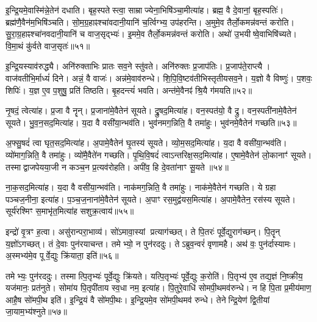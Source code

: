 इ॒न्द्रि॒यमे॒वास्मि॑न्ने॒तेन॑ दधाति।
बृह॒स्पतेस्त्वा॒ साम्राज्येना॒भि\-षि॑ञ्चा॒मीत्या॑ह।
ब्रह्म॒ वै दे॒वानां॒ बृह॒स्पतिः॑।
ब्रह्म॑णै॒वैन॑म॒भि\-षि॑ञ्चति।
सो॒म॒ग्र॒हाꣴश्चा॑वदानी॒यानि॑ च॒र्त्विग्भ्य॒ उप॑हरन्ति।
अ॒मुमे॒व तैर्लो॒कमन्न॑वन्तं करोति।
सु॒रा॒ग्र॒हाꣴश्चा॑नवदानी॒\-यानि॑ च वाज॒सृद्भ्यः॑।
इ॒ममे॒व तैर्लो॒कमन्न॑वन्तं करोति।
अथो॑ उ॒भयीष्वे॒वाभिषि॑च्यते।
वि॒मा॒थं कु॑र्वते वाज॒सृतः॑॥५१॥

इ॒न्द्रि॒यस्याव॑रुद्ध्यै।
अनि॑रुक्ताभिः प्रातः सव॒ने स्तु॑वते।
अनि॑रुक्तः प्र॒जाप॑तिः।
प्र॒जाप॑ते॒राप्त्यै।
वाज॑वतीभि॒र्माध्यं॑ दिने।
अन्नं॒ वै वाजः॑।
अन्न॑मे॒वाव॑रुन्धे।
शि॒पि॒वि॒ष्ट\-व॑तीभिस्तृतीयसव॒ने।
य॒ज्ञो वै विष्णुः॑।
प॒शवः॒ शिपिः॑।
य॒ज्ञ ए॒व प॒शुषु॒ प्रति॑ तिष्ठति।
बृ॒हदन्त्यं॑ भवति।
अन्त॑मे॒वैनꣴ॑ श्रि॒यै ग॑मयति॥५२॥\anuvakamend[अ॒श्नी॒यादन्न॑स्यान्न॒स्याव॑रुद्ध्या॒ इन्द्र॑स्य त्वा॒ साम्राज्येना॒भिषि॑ञ्चा॒मीत्या॑ह वाज॒सृतः॒ शिपि॒स्त्रीणि॑ च]

नृ॒षदं॒ त्वेत्या॑ह।
प्र॒जा वै नॄन्।
प्र॒जाना॑मे॒वैतेन॑ सूयते।
द्रु॒षद॒मित्या॑ह।
वन॒स्पत॑यो॒ वै द्रु।
वन॒स्पती॑नामे॒वैतेन॑ सूयते।
भु॒व॒न॒सद॒मित्या॑ह।
य॒दा वै वसी॑या॒न्भव॑ति।
भुव॑नमग॒न्निति॒ वै तमा॑हुः।
भुव॑नमे॒वैतेन॑ गच्छति॥५३॥

अ॒फ्सु॒षदं॑ त्वा घृत॒सद॒मित्या॑ह।
अ॒पामे॒वैतेन॑ घृ॒तस्य॑ सूयते।
व्यो॒म॒सद॒मित्या॑ह।
य॒दा वै वसी॑या॒न्भव॑ति।
व्यो॑माग॒न्निति॒ वै तमा॑हुः।
व्यो॑मै॒वैते॑न गच्छति।
पृ॒थि॒वि॒षदं॑ त्वा\-ऽन्तरिक्ष॒सद॒मित्या॑ह।
ए॒षामे॒वैतेन॑ लो॒कानाꣳ॑ सूयते।
तस्माद्वाजपेयया॒जी न कञ्च॒न प्र॒त्यव॑रोहति।
अपी॑व॒ हि दे॒वता॑नाꣳ सू॒यते॥५४॥

ना॒क॒सद॒मित्या॑ह।
य॒दा वै वसी॑या॒न्भव॑ति।
नाक॑मग॒न्निति॒ वै तमा॑हुः।
नाक॑मे॒वैतेन॑ गच्छति।
ये ग्रहा पञ्चज॒नीना॒ इत्या॑ह।
प॒ञ्च॒ज॒नाना॑मे॒वैतेन॑ सूयते।
अ॒पाꣳ रस॒मुद्व॑यस॒मित्या॑ह।
अ॒पामे॒वैतेन॒ रस॑स्य सूयते।
सूर्य॑रश्मिꣳ स॒माभृ॑त॒मित्या॑ह सशुक्र॒त्वाय॑॥५५॥\anuvakamend[ग॒च्छ॒ति॒ सू॒यते॒ नव॑ च]

इन्द्रो॑ वृ॒त्रꣳ ह॒त्वा।
असु॑रान्परा॒भाव्य॑।
सो॑ऽमावा॒स्यां प्रत्याग॑च्छत्।
ते पि॒तरः॑ पूर्वे॒द्युराग॑च्छन्।
पि॒तॄन् य॒ज्ञो॑\-ऽगच्छत्।
तं दे॒वाः पुन॑रयाचन्त।
तमेभ्यो॒ न पुन॑रददुः।
तेऽब्रुव॒न्वरं॑ वृणामहै।
अथ॑ वः॒ पुन॑र्दास्यामः।
अ॒स्मभ्य॑मे॒व पूर्वे॒द्युः क्रि॑याता॒ इति॑॥५६॥

तमेभ्यः॒ पुन॑रददुः।
तस्मात्पि॒तृभ्यः॑ पूर्वे॒द्युः क्रि॑यते।
यत्पि॒तृभ्यः॑ पूर्वे॒द्युः क॒रोति॑।
पि॒तृभ्य॑ ए॒व तद्य॒ज्ञं नि॒ष्क्रीय॒ यज॑मानः॒ प्रत॑नुते।
सोमा॑य पि॒तृपी॑ताय स्व॒धा नम॒ इत्या॑ह।
पि॒तुरे॒वाधि॑ सोमपी॒थमव॑रुन्धे।
न हि पि॒ता प्र॒मीय॑माण॒ आहै॒ष सो॑मपी॒थ इति॑।
इ॒न्द्रि॒यं वै सो॑मपी॒थः।
इ॒न्द्रि॒यमे॒व सो॑मपी॒थमव॑ रुन्धे।
तेनेन्द्रि॒येण॑ द्वि॒तीयां जा॒याम॒भ्य॑श्नुते॥५७॥

